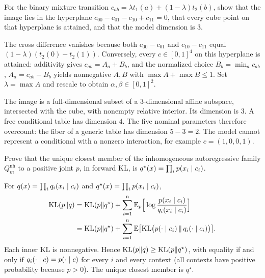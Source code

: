 \begin{hwqbox}
For the binary mixture transition $c_{ab}=\lambda t_1(a)+(1-\lambda)t_2(b)$, show that the image lies in the hyperplane $c_{00}-c_{01}-c_{10}+c_{11}=0$, that every cube point on that hyperplane is attained, and that the model dimension is $3$.
\end{hwqbox}
\begin{hwsolbox}
The cross difference vanishes because both $c_{00}-c_{01}$ and $c_{10}-c_{11}$ equal $(1-\lambda)(t_2(0)-t_2(1))$. Conversely, every $c\in[0,1]^4$ on this hyperplane is attained: additivity gives $c_{ab}=A_a+B_b$, and the normalized choice $B_b=\min_a c_{ab}$, $A_a=c_{ab}-B_b$ yields nonnegative $A,B$ with $\max A+\max B\le 1$. Set $\lambda=\max A$ and rescale to obtain $\alpha,\beta\in[0,1]^2$.

The image is a full-dimensional subset of a $3$-dimensional affine subspace, intersected with the cube, with nonempty relative interior. Its dimension is $3$. A free conditional table has dimension $4$. The five nominal parameters therefore overcount: the fiber of a generic table has dimension $5-3=2$. The model cannot represent a conditional with a nonzero interaction, for example $c=(1,0,0,1)$.
\end{hwsolbox}

\begin{hwqbox}
Prove that the unique closest member of the inhomogeneous autoregressive family $Q_m^{\mathrm{nh}}$ to a positive joint $p$, in forward KL, is $q^\star(x)=\prod_i p(x_i\mid c_i)$.
\end{hwqbox}
\begin{hwsolbox}
For $q(x)=\prod_i q_i(x_i\mid c_i)$ and $q^\star(x)=\prod_i p(x_i\mid c_i)$,
\begin{align*}
\mathrm{KL}(p\Vert q)
&=\mathrm{KL}(p\Vert q^\star)+\sum_{i=1}^n\mathbb{E}_p\Big[\log\frac{p(x_i\mid c_i)}{q_i(x_i\mid c_i)}\Big]\\
&=\mathrm{KL}(p\Vert q^\star)+\sum_{i=1}^n\mathbb{E}\big[\mathrm{KL}\big(p(\cdot\mid c_i)\,\|\,q_i(\cdot\mid c_i)\big)\big].
\end{align*}
Each inner KL is nonnegative. Hence $\mathrm{KL}(p\Vert q)\ge\mathrm{KL}(p\Vert q^\star)$, with equality if and only if $q_i(\cdot\mid c)=p(\cdot\mid c)$ for every $i$ and every context (all contexts have positive probability because $p>0$). The unique closest member is $q^\star$.
\end{hwsolbox}

